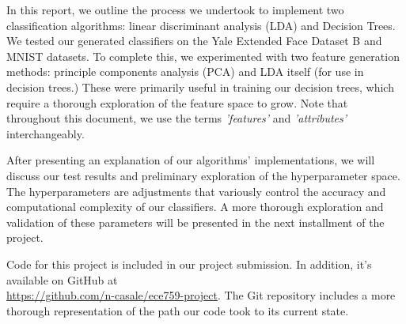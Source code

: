 In this report, we outline the process we undertook to implement two classification algorithms: linear discriminant analysis (LDA) and Decision Trees. We tested our generated classifiers on the Yale Extended Face Dataset B  and MNIST \cite{lecun-mnisthandwrittendigit-2010} datasets. To complete this, we experimented with two feature generation methods: principle components analysis (PCA) and LDA itself (for use in decision trees.) These were primarily useful in training our decision trees, which require a thorough exploration of the feature space to grow. Note that throughout this document, we use the terms \emph{'features'} and \emph{'attributes'} interchangeably.

After presenting an explanation of our algorithms' implementations, we will discuss our test results and preliminary exploration of the hyperparameter space. The hyperparameters are adjustments that variously control the accuracy and computational complexity of our classifiers. A more thorough exploration and validation of these parameters will be presented in the next installment of the project.

Code for this project is included in our project submission. In addition, it's available on GitHub at\\ \href{https://github.com/n-casale/ece759-project}{https://github.com/n-casale/ece759-project}. The Git repository includes a more thorough representation of the path our code took to its current state. 